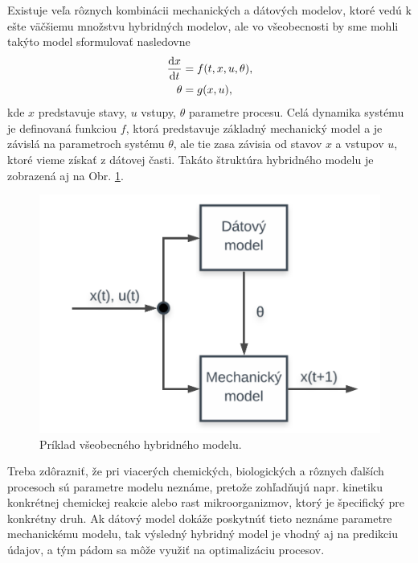 Existuje veľa rôznych kombinácii mechanických a dátových modelov, ktoré vedú k ešte väčšiemu množstvu hybridných modelov, ale vo všeobecnosti by sme mohli takýto model sformulovať nasledovne
\begin{equation}
	\begin{split}
		\frac{\text{d}x}{\text{d}t} &= f(t,x,u,\theta), \\
		\theta &= g(x,u),
	\end{split}
\end{equation}
kde $ x $ predstavuje stavy, $ u $ vstupy, $ \theta $ parametre procesu. Celá dynamika systému je definovaná funkciou $ f $, ktorá predstavuje základný mechanický model a je závislá na parametroch systému $ \theta $, ale tie zasa závisia od stavov $ x $ a vstupov $ u $, ktoré vieme získať z dátovej časti. Takáto štruktúra hybridného modelu je zobrazená aj na Obr. \ref{fig:hybrid_model_general}.

\begin{figure}
	\centering
	\includegraphics[width=0.5\linewidth]{images/hybrid_model}
	\caption{Príklad všeobecného hybridného modelu.}
	\label{fig:hybrid_model_general}
\end{figure}

Treba zdôrazniť, že pri viacerých chemických, biologických a rôznych ďalších procesoch sú parametre modelu neznáme, pretože zohľadňujú napr. kinetiku konkrétnej chemickej reakcie alebo rast mikroorganizmov, ktorý je špecifický pre konkrétny druh. Ak dátový model dokáže poskytnúť tieto neznáme parametre mechanickému modelu, tak výsledný hybridný model je vhodný aj na predikciu údajov, a tým pádom sa môže využiť na optimalizáciu procesov. 